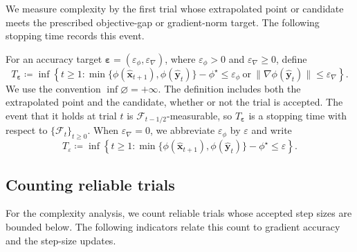 \documentclass{article}
\begin{document}
We measure complexity by the first trial whose extrapolated point or candidate meets the prescribed objective-gap or gradient-norm target. The following stopping time records this event.
\begin{definition}
\label{Stopping_time}
For an  accuracy target
\(\boldsymbol{\varepsilon}
=(\varepsilon_\phi,\varepsilon_\nabla)\), where
\(\varepsilon_\phi>0\) and \(\varepsilon_\nabla\ge0\), define
\begin{equation}\label{eq_dfn_stopping_time}
T_{\boldsymbol{\varepsilon}}
\coloneqq 
\inf\left\{
t\ge1:
\min\{\phi(\hat {\bm{x}}_{t+1}),\phi(\hat {\bm{y}}_t)\}-\phi^\star
\le\varepsilon_\phi
\ \text{or}\
\|\nabla\phi(\hat {\bm{y}}_t)\|\le\varepsilon_\nabla
\right\}.
\end{equation}
We use the convention $\inf\varnothing=+\infty$. The definition includes both the extrapolated point and the candidate, whether or not the trial is accepted. The event that it holds at trial $t$ is $\mathcal F_{t-1/2}$-measurable, so $T_{\boldsymbol{\varepsilon}}$ is a stopping time with respect to $\{\mathcal F_t\}_{t\geq0}$. When $\varepsilon_\nabla=0$, we abbreviate $\varepsilon_\phi$ by $\varepsilon$ and write
\[
T_\varepsilon
\coloneqq 
\inf\left\{
t\ge1:
\min\{\phi(\hat {\bm{x}}_{t+1}),\phi(\hat {\bm{y}}_t)\}-\phi^\star
\le\varepsilon
\right\}.
\]
\end{definition}

\subsection{Counting reliable trials}
\label{subsec:acceptance}
For the complexity analysis, we count reliable trials whose
accepted step sizes are bounded below. The following indicators
relate this count to gradient accuracy and the step-size updates.
\end{document}
